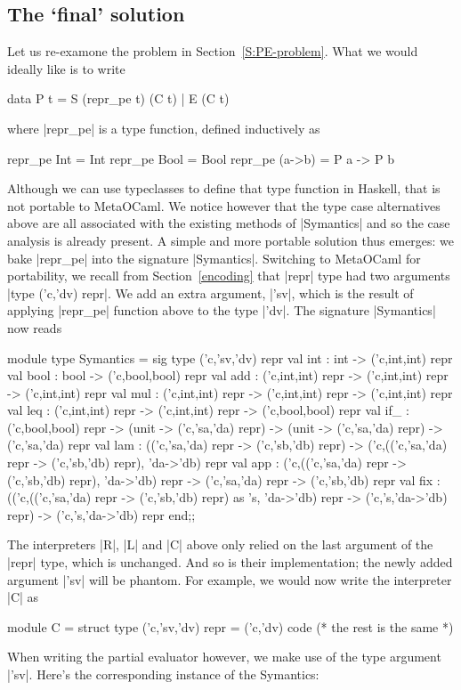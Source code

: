 \documentclass[preprint]{sigplanconf}
\begin{document}
\subsection{The `final' solution}
\label{S:PE-solution}
Let us re-examone the problem in Section~\ref{S:PE-problem}. What we
would ideally like is to write
\begin{code}
data P t = S (repr_pe t) (C t) | E (C t)
\end{code}
where |repr_pe| is a type function, defined inductively
as 
\begin{code}
repr_pe Int    = Int
repr_pe Bool   = Bool
repr_pe (a->b) = P a -> P b
\end{code}
Although we can use typeclasses to define that type function
in Haskell, that is not portable to MetaOCaml. We notice however that
the type case alternatives above are all associated with the existing
methods of |Symantics| and so the case analysis is already present. 
A simple and more portable solution thus emerges: we bake |repr_pe| 
into the signature |Symantics|. Switching to MetaOCaml for
portability, we recall from Section~\ref{encoding} that |repr| type
had two arguments |type ('c,'dv) repr|. We add an extra argument,
|'sv|, which is the result of applying |repr_pe| function above to the
type |'dv|. The signature |Symantics| now reads
\begin{code}
module type Symantics = sig
  type ('c,'sv,'dv) repr
  val int  : int  -> ('c,int,int) repr
  val bool : bool -> ('c,bool,bool) repr
  val add  : ('c,int,int) repr -> 
      ('c,int,int) repr -> ('c,int,int) repr
  val mul  : ('c,int,int) repr -> 
      ('c,int,int) repr -> ('c,int,int) repr
  val leq  : ('c,int,int) repr -> 
      ('c,int,int) repr -> ('c,bool,bool) repr
  val if_  : ('c,bool,bool) repr ->
             (unit -> ('c,'sa,'da) repr) ->
             (unit -> ('c,'sa,'da) repr) -> 
             ('c,'sa,'da) repr 
  val lam : (('c,'sa,'da) repr -> ('c,'sb,'db) repr)
    -> ('c,(('c,'sa,'da) repr -> ('c,'sb,'db) repr),
           'da->'db) repr
  val app : ('c,(('c,'sa,'da) repr -> ('c,'sb,'db) repr),
             'da->'db) repr
    -> ('c,'sa,'da) repr -> ('c,'sb,'db) repr
  val fix : 
    (('c,(('c,'sa,'da) repr -> ('c,'sb,'db) repr) as 's,
         'da->'db) repr 
    -> ('c,'s,'da->'db) repr)  -> ('c,'s,'da->'db) repr
end;;
\end{code}
The interpreters |R|, |L| and |C| above only relied on the last
argument of the |repr| type, which is unchanged. And so is their
implementation; the newly added argument |'sv| will be phantom.
For example, we would now write the interpreter |C| as
\begin{code}
module C = struct
  type ('c,'sv,'dv) repr = ('c,'dv) code
  (* the rest is the same *)
\end{code}
When writing the partial evaluator however, we make use of the
type argument |'sv|. Here's the corresponding instance of the
Symantics:
\end{document}
